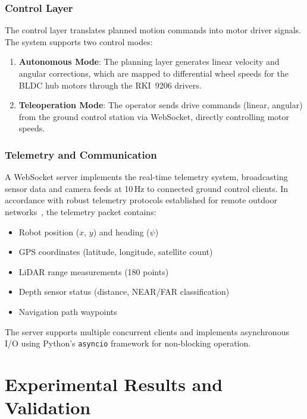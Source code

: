 \documentclass[conference]{IEEEtran}
\begin{document}
\subsubsection{Control Layer}

The control layer translates planned motion commands into motor driver signals. The system supports two control modes:

\begin{enumerate}
    \item \textbf{Autonomous Mode}: The planning layer generates linear velocity and angular corrections, which are mapped to differential wheel speeds for the BLDC hub motors through the RKI~9206 drivers.
    \item \textbf{Teleoperation Mode}: The operator sends drive commands (linear, angular) from the ground control station via WebSocket, directly controlling motor speeds.
\end{enumerate}

\subsubsection{Telemetry and Communication}

A WebSocket server implements the real-time telemetry system, broadcasting sensor data and camera feeds at 10\,Hz to connected ground control clients. In accordance with robust telemetry protocols established for remote outdoor networks~\cite{fisher2025developing, memet2025adaptive}, the telemetry packet contains:

\begin{itemize}
    \item Robot position ($x$, $y$) and heading ($\psi$)
    \item GPS coordinates (latitude, longitude, satellite count)
    \item LiDAR range measurements (180 points)
    \item Depth sensor status (distance, NEAR/FAR classification)
    \item Navigation path waypoints
\end{itemize}

The server supports multiple concurrent clients and implements asynchronous I/O using Python's \texttt{asyncio} framework for non-blocking operation.

\section{Experimental Results and Validation}
\label{sec:results}
\end{document}
